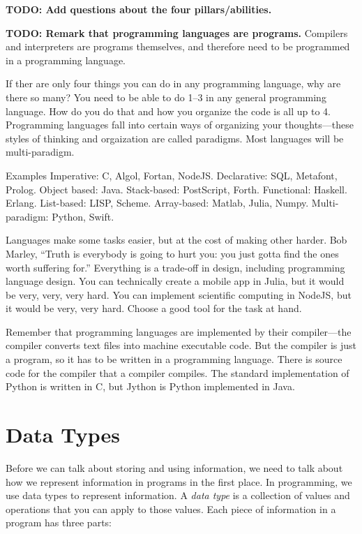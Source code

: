\textbf{TODO: Add questions about the four pillars/abilities.}

\textbf{TODO: Remark that programming languages are programs.} Compilers and interpreters are programs themselves, and therefore need to be programmed in a programming language.

If ther are only four things you can do in any programming language, why are there so many? You need to be able to do 1--3 in any general programming language. How do you do that and how you organize the code is all up to 4. Programming languages fall into certain ways of organizing your thoughts---these styles of thinking and orgaization are called paradigms. Most languages will be multi-paradigm.

Examples Imperative: C, Algol, Fortan, NodeJS. Declarative: SQL, Metafont, Prolog. Object based: Java.  Stack-based: PostScript, Forth. Functional: Haskell. Erlang. List-based: LISP, Scheme. Array-based: Matlab, Julia, Numpy. Multi-paradigm: Python, Swift.

Languages make some tasks easier, but at the cost of making other harder. Bob Marley, ``Truth is everybody is going to hurt you: you just gotta find the ones worth suffering for.'' Everything is a trade-off in design, including programming language design. You can technically create a mobile app in Julia, but it would be very, very, very hard. You can implement scientific computing in NodeJS, but it would be very, very hard. Choose a good tool for the task at hand.

Remember that programming languages are implemented by their compiler---the compiler converts text files into machine executable code. But the compiler is just a program, so it has to be written in a programming language. There is source code for the compiler that a compiler compiles. The standard implementation of Python is written in C, but Jython is Python implemented in Java.

\section{Data Types}
Before we can talk about storing and using information, we need to talk about how we represent information in programs in the first place. In programming, we use data types to represent information. A \emph{data type} is a collection of values and operations that you can apply to those values. Each piece of information in a program has three parts:

